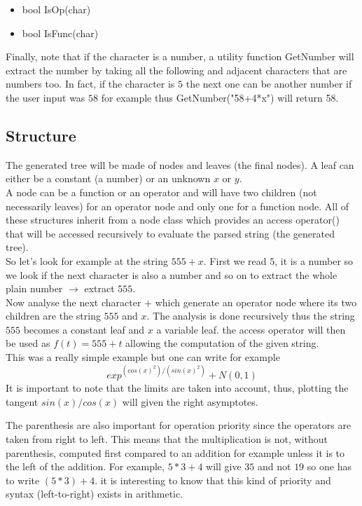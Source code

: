 \documentclass[a4paper]{report}
\begin{document}
\begin{itemize}
\item bool IsOp(char)
\item bool IsFunc(char)
\end{itemize}

Finally, note that if the character is a number, a utility function GetNumber will extract the number by taking all the following and adjacent characters that are numbers too. In fact, if the character is $5$ the next one can be another number if the user input was $58$ for example thus GetNumber("58+4*x") will return 58.\\
\subsection{Structure}
The generated tree will be made of nodes and leaves (the final nodes). A leaf can either be a constant (a number) or an unknown $x$ or $y$.\\
A node can be a function or an operator and will have two children (not necessarily leaves) for an operator node and only one for a function node. All of these structures inherit from a node class which provides an access operator() that will be accessed recursively to evaluate the parsed string (the generated tree).
\\



So let's look for example at the string $555+x$.
First we read $5$, it is a number so we look if the next character is also a number and so on to extract the whole plain number $\rightarrow$ extract $555$. \\
Now analyse the next character $+$ which generate an operator node where its two children are the string $555$ and $x$. The analysis is done recursively thus the string $555$ becomes a constant leaf and $x $ a variable leaf.
the access operator will then be used as $f(t)=555+t$ allowing the computation of the given string.\\
This was a really simple example but one can write for example
\[exp^{(cos(x)^2)/(sin(x)^2)}+N(0,1)
\]
It is important to note that the limits are taken into account, thus, plotting the tangent $sin(x)/cos(x)$ will given the right asymptotes.



The parenthesis are also important for operation priority since the operators are taken from right to left. This means that the multiplication is not, without parenthesis, computed first compared to an addition for example unless it is to the left of the addition. For example, $5*3+4$ will give $35$ and not $19$ so one has to write $(5*3)+4$.
it is interesting to know that this kind of priority and syntax (left-to-right) exists in arithmetic.
\end{document}

